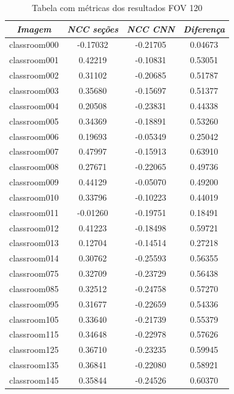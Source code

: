 \documentclass[cic,tc]{iiufrgs}
\begin{document}
\begin{table}[h]
    \caption{Tabela com métricas dos resultados FOV 120\degree}
    \vspace{0.5em}
    \centering
        \begin{tabular}{|c|c|c|c|}
          \hline
          \textit{Imagem} & \textit{NCC seções} & \textit{NCC CNN} & \textit{Diferença} \\
          \hline
          \hline
          classroom000 & -0.17032 & -0.21705 & 0.04673 \\
          classroom001 & 0.42219 & -0.10831 & 0.53051 \\
          classroom002 & 0.31102 & -0.20685 & 0.51787 \\
          classroom003 & 0.35680 & -0.15697 & 0.51377 \\
          classroom004 & 0.20508 & -0.23831 & 0.44338 \\
          classroom005 & 0.34369 & -0.18891 & 0.53260 \\
          classroom006 & 0.19693 & -0.05349 & 0.25042 \\
          classroom007 & 0.47997 & -0.15913 & 0.63910 \\
          classroom008 & 0.27671 & -0.22065 & 0.49736 \\
          classroom009 & 0.44129 & -0.05070 & 0.49200 \\
          classroom010 & 0.33796 & -0.10223 & 0.44019 \\
          classroom011 & -0.01260 & -0.19751 & 0.18491 \\
          classroom012 & 0.41223 & -0.18498 & 0.59721 \\
          classroom013 & 0.12704 & -0.14514 & 0.27218 \\
          classroom014 & 0.30762 & -0.25593 & 0.56355 \\
          classroom075 & 0.32709 & -0.23729 & 0.56438 \\
          classroom085 & 0.32512 & -0.24758 & 0.57270 \\
          classroom095 & 0.31677 & -0.22659 & 0.54336 \\
          classroom105 & 0.33640 & -0.21739 & 0.55379 \\
          classroom115 & 0.34648 & -0.22978 & 0.57626 \\
          classroom125 & 0.36710 & -0.23235 & 0.59945 \\
          classroom135 & 0.36841 & -0.22080 & 0.58921 \\
          classroom145 & 0.35844 & -0.24526 & 0.60370 \\

\end{tabular}
\end{table}
\end{document}
